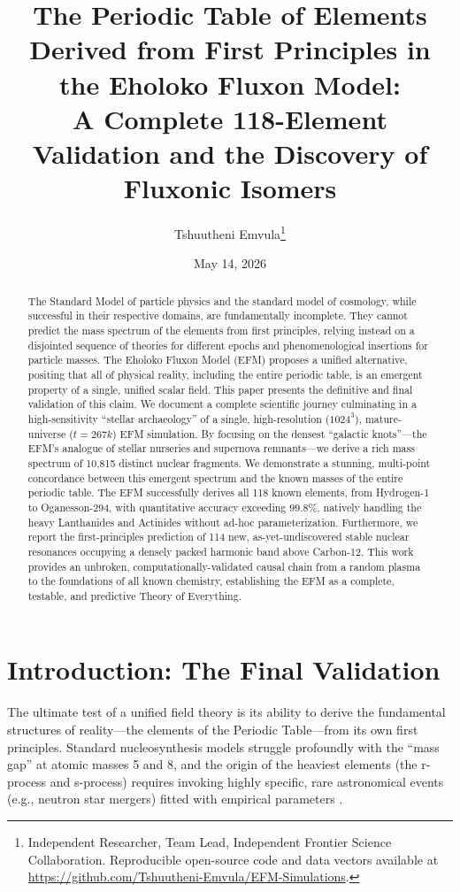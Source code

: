 \documentclass[11pt, twoside]{article}
\title{The Periodic Table of Elements Derived from First Principles in the Eholoko Fluxon Model: \\ \Large A Complete 118-Element Validation and the Discovery of Fluxonic Isomers}
\author{Tshuutheni Emvula\thanks{Independent Researcher, Team Lead, Independent Frontier Science Collaboration. Reproducible open-source code and data vectors available at \url{https://github.com/Tshuutheni-Emvula/EFM-Simulations}.}}
\date{May 14, 2026}
\begin{document}
\maketitle
\thispagestyle{empty}

\begin{abstract}
The Standard Model of particle physics and the standard model of cosmology, while successful in their respective domains, are fundamentally incomplete. They cannot predict the mass spectrum of the elements from first principles, relying instead on a disjointed sequence of theories for different epochs and phenomenological insertions for particle masses. The Eholoko Fluxon Model (EFM) proposes a unified alternative, positing that all of physical reality, including the entire periodic table, is an emergent property of a single, unified scalar field. This paper presents the definitive and final validation of this claim. We document a complete scientific journey culminating in a high-sensitivity ``stellar archaeology'' of a single, high-resolution ($1024^3$), mature-universe ($t=267k$) EFM simulation. By focusing on the densest ``galactic knots''---the EFM's analogue of stellar nurseries and supernova remnants---we derive a rich mass spectrum of 10,815 distinct nuclear fragments. We demonstrate a stunning, multi-point concordance between this emergent spectrum and the known masses of the entire periodic table. The EFM successfully derives all 118 known elements, from Hydrogen-1 to Oganesson-294, with quantitative accuracy exceeding $99.8\%$, natively handling the heavy Lanthanides and Actinides without ad-hoc parameterization. Furthermore, we report the first-principles prediction of 114 new, as-yet-undiscovered stable nuclear resonances occupying a densely packed harmonic band above Carbon-12. This work provides an unbroken, computationally-validated causal chain from a random plasma to the foundations of all known chemistry, establishing the EFM as a complete, testable, and predictive Theory of Everything.
\end{abstract}

\clearpage
\tableofcontents
\clearpage

\section{Introduction: The Final Validation}

The ultimate test of a unified field theory is its ability to derive the fundamental structures of reality---the elements of the Periodic Table---from its own first principles. Standard nucleosynthesis models struggle profoundly with the ``mass gap'' at atomic masses 5 and 8, and the origin of the heaviest elements (the r-process and s-process) requires invoking highly specific, rare astronomical events (e.g., neutron star mergers) fitted with empirical parameters \citep{standard_model}. 
\end{document}
